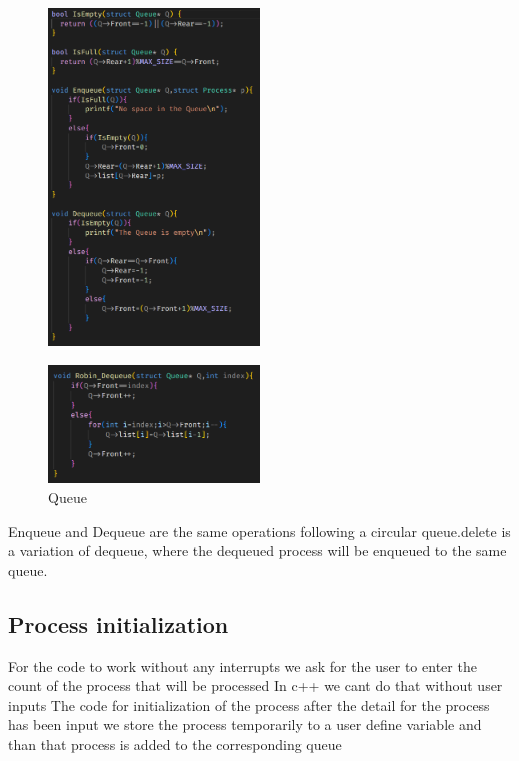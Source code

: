 \documentclass{article}
\begin{document}
\begin{figure}[h!]
    \centering
    \includegraphics[width=0.5\textwidth,]{2.png}
\end{figure}
\begin{figure}[h!]
    \centering
    \includegraphics[width=0.5\textwidth,]{3.png}
    \caption{Queue}
    \label{fig:nw}
\end{figure}

\newpage
Enqueue and Dequeue are the same operations following a circular queue.delete is a variation of dequeue, where the dequeued process will be enqueued to the same queue.

\vspace{\baselineskip}
\subsection{Process initialization}
\vspace{\baselineskip}

For the code to work without any interrupts we ask for the user to enter the count of the process that will be processed In c++ we cant do that without user inputs 
The code for initialization of the process after the detail for the process has been input we store the process temporarily to a user define variable and than that process is added to the corresponding queue
\end{document}
